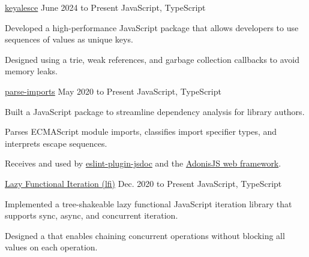 
\begin{cventry}
    {\href{https://github.com/TomerAberbach/keyalesce}{keyalesce}}{}
    {June 2024 to Present}
    {JavaScript, TypeScript}
    \begin{cvitems}
        \item Developed a high-performance JavaScript package that allows developers to use sequences of values as unique keys.
        \item Designed  using a trie, weak references, and garbage collection callbacks to avoid memory leaks.
    \end{cvitems}
\end{cventry}

\begin{cventry}
    {\href{https://github.com/TomerAberbach/parse-imports}{parse-imports}}{}
    {May 2020 to Present}
    {JavaScript, TypeScript}
    \begin{cvitems}
        \item Built a JavaScript package to streamline dependency analysis for library authors.
        \item Parses ECMAScript module imports, classifies import specifier types, and interprets escape sequences.
        \item Receives  and used by \href{https://github.com/gajus/eslint-plugin-jsdoc}{eslint-plugin-jsdoc} and the \href{https://adonisjs.com}{AdonisJS web framework}.
    \end{cvitems}
\end{cventry}

\begin{cventry}
    {\href{https://github.com/TomerAberbach/lfi}{Lazy Functional Iteration (lfi)}}{}
    {Dec. 2020 to Present}
    {JavaScript, TypeScript}
    \begin{cvitems}
        \item Implemented a tree-shakeable lazy functional JavaScript iteration library that supports sync, async, and concurrent iteration.
        \item Designed a  that enables chaining concurrent operations without blocking all values on each operation.
    \end{cvitems}
\end{cventry}
